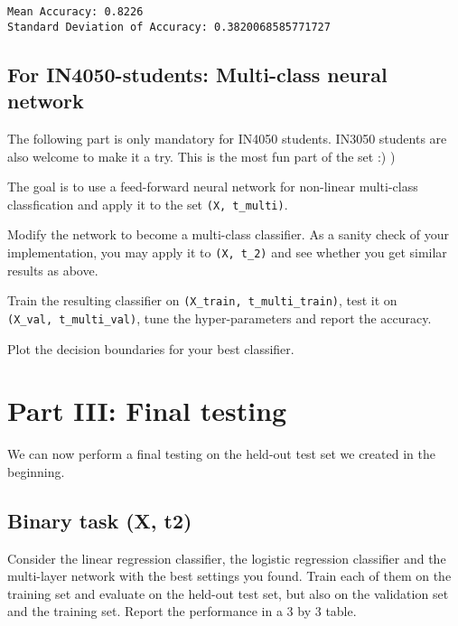 \documentclass[11pt]{article}
\begin{document}
    \begin{Verbatim}[commandchars=\\\{\}]
Mean Accuracy: 0.8226
Standard Deviation of Accuracy: 0.3820068585771727
    \end{Verbatim}

    \hypertarget{for-in4050-students-multi-class-neural-network}{%
\subsection{For IN4050-students: Multi-class neural
network}\label{for-in4050-students-multi-class-neural-network}}

    The following part is only mandatory for IN4050 students. IN3050
students are also welcome to make it a try. This is the most fun part of
the set :) )

The goal is to use a feed-forward neural network for non-linear
multi-class classfication and apply it to the set
\texttt{(X,\ t\_multi)}.

Modify the network to become a multi-class classifier. As a sanity check
of your implementation, you may apply it to \texttt{(X,\ t\_2)} and see
whether you get similar results as above.

Train the resulting classifier on \texttt{(X\_train,\ t\_multi\_train)},
test it on \texttt{(X\_val,\ t\_multi\_val)}, tune the hyper-parameters
and report the accuracy.

Plot the decision boundaries for your best classifier.

    \hypertarget{part-iii-final-testing}{%
\section{Part III: Final testing}\label{part-iii-final-testing}}

We can now perform a final testing on the held-out test set we created
in the beginning.

\hypertarget{binary-task-x-t2}{%
\subsection{Binary task (X, t2)}\label{binary-task-x-t2}}

Consider the linear regression classifier, the logistic regression
classifier and the multi-layer network with the best settings you found.
Train each of them on the training set and evaluate on the held-out test
set, but also on the validation set and the training set. Report the
performance in a 3 by 3 table.
\end{document}
